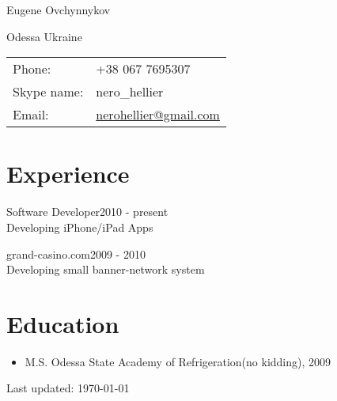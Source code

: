 \documentclass[letterpaper]{article}
\def\name{Eugene Ovchynnykov}
\begin{document}
{\huge \name}

\vspace{0.25in}

\begin{minipage}{0.45\linewidth}
  Odessa
  Ukraine
\end{minipage}

\begin{minipage}{0.45\linewidth}
  \begin{tabular}{ll}
    Phone: & +38 067 7695307 \\
    Skype name: & nero\_hellier\\
    Email: & \href{mailto:nerohellier@gmail.com}{nerohellier@gmail.com} \\
  \end{tabular}
\end{minipage}

\section*{Experience}

\begin{description}
  \item{Software Developer}\hfill 2010 - present\\
    Developing iPhone/iPad Apps

  \item{grand-casino.com}\hfil 2009 - 2010\\
    Developing small banner-network system
\end{description}

\section*{Education}

\begin{itemize}
  \item M.S. Odessa State Academy of Refrigeration(no kidding), 2009
\end{itemize}
    

\begin{center}
  \begin{footnotesize}
    Last updated: \today \\
  \end{footnotesize}
\end{center}
\end{document}

